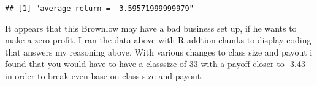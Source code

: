 \documentclass[]{article}
\begin{document}
\begin{verbatim}
## [1] "average return =  3.59571999999979"
\end{verbatim}

It appears that this Brownlow may have a bad business set up, if he
wants to make a zero profit. I ran the data above with R addtion chunks
to display coding that answers my reasoning above. With various changes
to class size and payout i found that you would have to have a classsize
of 33 with a payoff closer to -3.43 in order to break even base on class
size and payout.
\end{document}
